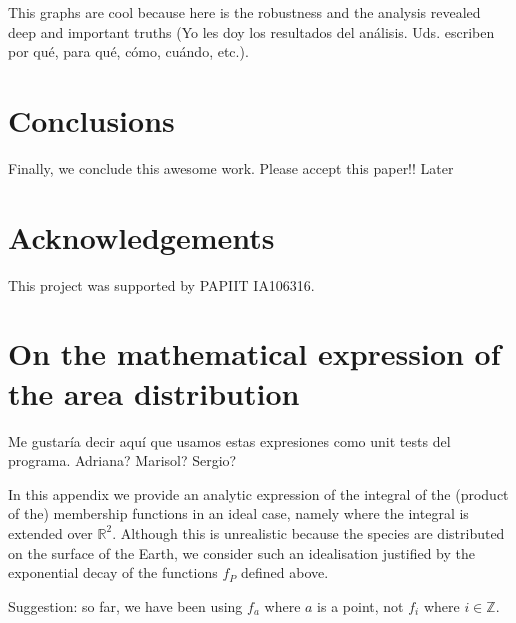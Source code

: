 \documentclass[12pt]{article}
\numberwithin{equation}{section} %
\numberwithin{figure}{section} %
\def\ZZ{{\mathbb{Z}}}
\theoremstyle{definition}
\def\tcr#1{\textcolor{MyRed}{#1}}
\begin{document}
This graphs are cool because here is the robustness and the analysis revealed deep and important truths \tcr{(Yo les doy los resultados del análisis. Uds. escriben por qué, para qué, cómo, cuándo, etc.)}. 

\section{Conclusions}

Finally, we conclude this awesome work. Please accept this paper!! \tcr{Later}


\section*{Acknowledgements}

This project was supported by PAPIIT IA106316.






\appendix
\section{On the mathematical expression of the area distribution}

\tcr{Me gustaría decir aquí que usamos estas expresiones como unit tests del programa. Adriana? Marisol? Sergio?}

In this appendix we provide an analytic expression of the integral of the (product of the) membership functions in an ideal case, namely where the integral is extended over ${\mathbb R}^2$. Although this is unrealistic because the species are distributed on the surface of the Earth, we consider such an idealisation justified by the exponential decay of the functions $f_P$ defined above.

\tcr{Suggestion: so far, we have been using $f_a$ where $a$ is a point, not $f_i$ where $i\in\ZZ$.}
\end{document}
